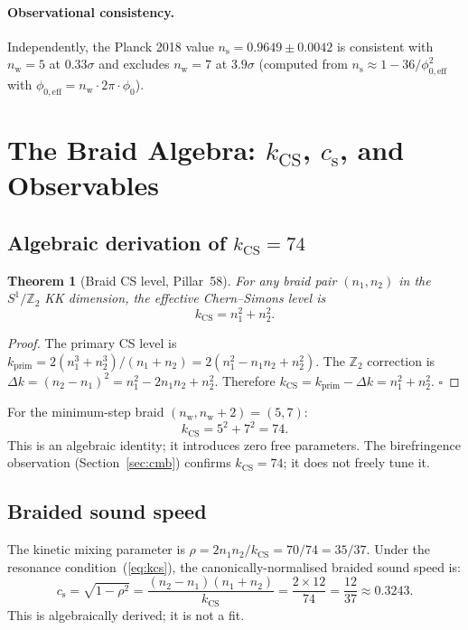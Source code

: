 \documentclass[12pt,a4paper]{article}
\newtheorem{theorem}{Theorem}[section]
\newcommand{\nw}{n_{\mathrm{w}}}
\newcommand{\kcs}{k_{\mathrm{CS}}}
\newcommand{\cs}{c_{\mathrm{s}}}
\newcommand{\ns}{n_{\mathrm{s}}}
\begin{document}
\paragraph{Observational consistency.}
Independently, the Planck 2018 value $\ns=0.9649\pm0.0042$ is consistent with
$\nw=5$ at $0.33\sigma$ and excludes $\nw=7$ at $3.9\sigma$
(computed from $\ns\approx 1-36/\phi_{0,\mathrm{eff}}^2$ with
$\phi_{0,\mathrm{eff}}=\nw\cdot 2\pi\cdot\phi_0$).

\section{The Braid Algebra: $\kcs$, $\cs$, and Observables}
\label{sec:braid}

\subsection{Algebraic derivation of $\kcs=74$}

\begin{theorem}[Braid CS level, Pillar~58]
  For any braid pair $(n_1,n_2)$ in the $S^1/\mathbb{Z}_2$ KK dimension, the
  effective Chern--Simons level is
  \begin{equation}
    \kcs = n_1^2 + n_2^2 .
    \label{eq:kcs}
  \end{equation}
\end{theorem}
\begin{proof}
  The primary CS level is $k_{\mathrm{prim}}=2(n_1^3+n_2^3)/(n_1+n_2)=
  2(n_1^2-n_1 n_2+n_2^2)$.  The $\mathbb{Z}_2$ correction is
  $\Delta k = (n_2-n_1)^2 = n_1^2-2n_1 n_2+n_2^2$.
  Therefore $\kcs = k_{\mathrm{prim}}-\Delta k = n_1^2+n_2^2$.  $\square$
\end{proof}

For the minimum-step braid $(\nw,\nw{+}2)=(5,7)$:
\begin{equation}
  \boxed{\kcs = 5^2+7^2 = 74 .}
  \label{eq:kcs74}
\end{equation}
This is an algebraic identity; it introduces zero free parameters.
The birefringence observation (Section~\ref{sec:cmb}) confirms $\kcs=74$;
it does not freely tune it.

\subsection{Braided sound speed}

The kinetic mixing parameter is $\rho = 2n_1 n_2/\kcs = 70/74 = 35/37$.
Under the resonance condition~(\ref{eq:kcs}), the canonically-normalised
braided sound speed is:
\begin{equation}
  \cs = \sqrt{1-\rho^2} = \frac{(n_2-n_1)(n_1+n_2)}{\kcs}
      = \frac{2\times 12}{74} = \frac{12}{37} \approx 0.3243 .
  \label{eq:cs}
\end{equation}
This is algebraically derived; it is not a fit.
\end{document}
